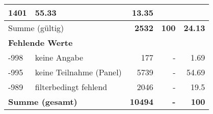 \begin{longtable}{lXrrr}
       \num{1401} &
       \num[round-mode=places,round-precision=2]{55.33} &
         \num[round-mode=places,round-precision=2]{13.35} \\
     \midrule
     \multicolumn{2}{l}{Summe (gültig)} &
       \textbf{\num{2532}} &
     \textbf{\num{100}} &
       \textbf{\num[round-mode=places,round-precision=2]{24.13}} \\
     \multicolumn{5}{l}{\textbf{Fehlende Werte}}\\
       -998 &
       keine Angabe &
         \num{177} &
        - &
         \num[round-mode=places,round-precision=2]{1.69} \\
       -995 &
       keine Teilnahme (Panel) &
         \num{5739} &
        - &
         \num[round-mode=places,round-precision=2]{54.69} \\
       -989 &
       filterbedingt fehlend &
         \num{2046} &
        - &
         \num[round-mode=places,round-precision=2]{19.5} \\
     \midrule
     \multicolumn{2}{l}{\textbf{Summe (gesamt)}} &
          \textbf{\num{10494}} &
        \textbf{-} &
        \textbf{\num{100}} \\
     \bottomrule
     \end{longtable}
     
